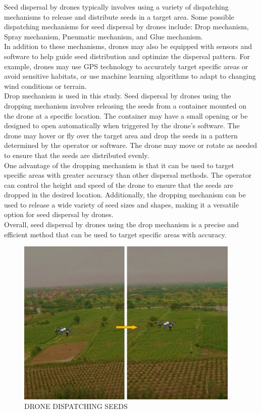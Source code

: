 \documentclass[pmlr,twocolumn,10pt]{jmlr}
\begin{document}
Seed dispersal by drones typically involves using a variety of dispatching mechanisms to release and distribute seeds in a target area. Some possible dispatching mechanisms for seed dispersal by drones include: Drop mechanism, Spray mechanism, Pneumatic mechanism, and Glue mechanism.
\\In addition to these mechanisms, drones may also be equipped with sensors and software to help guide seed distribution and optimize the dispersal pattern. For example, drones may use GPS technology to accurately target specific areas or avoid sensitive habitats, or use machine learning algorithms to adapt to changing wind conditions or terrain.
\\Drop mechanism is used in this study. Seed dispersal by drones using the dropping mechanism involves releasing the seeds from a container mounted on the drone at a specific location. The container may have a small opening or be designed to open automatically when triggered by the drone's software. The drone may hover or fly over the target area and drop the seeds in a pattern determined by the operator or software. The drone may move or rotate as needed to ensure that the seeds are distributed evenly.
\\One advantage of the dropping mechanism is that it can be used to target specific areas with greater accuracy than other dispersal methods. The operator can control the height and speed of the drone to ensure that the seeds are dropped in the desired location. Additionally, the dropping mechanism can be used to release a wide variety of seed sizes and shapes, making it a versatile option for seed dispersal by drones.
\\Overall, seed dispersal by drones using the drop mechanism is a precise and efficient method that can be used to target specific areas with accuracy.
\begin{figure}[htp]
    \centering
    \includegraphics[width=7.5 cm,height=8cm]{Slide2.PNG}
    \caption{DRONE DISPATCHING SEEDS}
    \label{fig:galaxy}
\end{figure}
\end{document}
